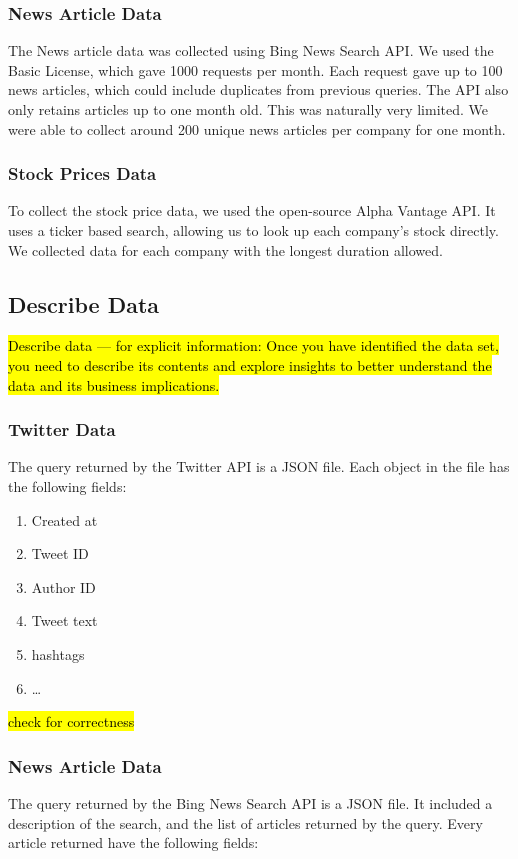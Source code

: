 \documentclass[sigconf, nonacm]{acmart}
\begin{document}
\subsubsection{News Article Data}
The News article data was collected using Bing News Search API. We used the Basic License, which gave 1000 requests per month. Each request gave up to 100 news articles, which could include duplicates from previous queries. The API also only retains articles up to one month old. This was naturally very limited. We were able to collect around 200 unique news articles per company for one month.

\subsubsection{Stock Prices Data}
To collect the stock price data, we used the open-source Alpha Vantage API. It uses a ticker based search, allowing us to look up each company's stock directly. We collected data for each company with the longest duration allowed.
\subsection{Describe Data} %
\hl{Describe data — for explicit information: Once you have identified the data set, you need to describe its contents and explore insights to better understand the data and its business implications.}

\subsubsection{Twitter Data}
The query returned by the Twitter API is a JSON file. Each object in the file has the following fields:

\begin{enumerate}
    \item Created at
    \item Tweet ID
    \item Author ID
    \item Tweet text
    \item hashtags
    \item \dots
\end{enumerate}

\hl{check for correctness}


\subsubsection{News Article Data}
The query returned by the Bing News Search API is a JSON file. It included a description of the search, and the list of articles returned by the query. Every article returned have the following fields:
\end{document}
